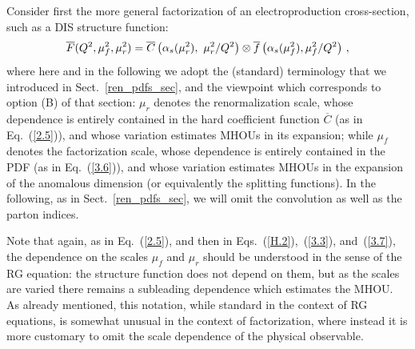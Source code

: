 Consider first
the more general factorization of an electroproduction cross-section,
such as a DIS structure function:
\begin{equation}
  \overline{F}(Q^2, \mu_f^2, \mu_r^2) = \overline{C} \left(
  \alpha_s(\mu_r^2),\ \mu_r^2/Q^2 \right) \otimes \overline{f} \left(
  \alpha_s(\mu_f^2), \mu_f^2/Q^2\right) \, ,
    \label{5.1}
\end{equation}
where here and in the following we adopt the (standard)
terminology  that
we introduced in Sect.~\ref{ren_pdfs_sec}, and the viewpoint which
corresponds to option (B) of that section: $\mu_r$ denotes the
renormalization scale, whose dependence is entirely contained in the
hard coefficient function $\overline{C}$ (as in Eq.~(\ref{2.5})),
and whose variation estimates MHOUs in its expansion; while $\mu_f$ denotes the
factorization scale, whose dependence is entirely contained in the PDF
(as in Eq.~(\ref{3.6})), and whose variation estimates MHOUs in the
expansion of the anomalous dimension (or equivalently the
splitting functions).
%
In the following, as in Sect.~\ref{ren_pdfs_sec}, we will omit the
convolution as well as the parton indices.

Note that again, as in Eq.~(\ref{2.5}), and then in
Eqs.~(\ref{H.2}),~(\ref{3.3}), and~(\ref{3.7}), the dependence on the scales
$\mu_f$ and $\mu_r$ should be understood in the sense of the RG equation: the structure
function does not depend on them, but as the scales are varied there
remains a subleading dependence which estimates the MHOU.
%
As
already mentioned, this notation, while standard in the context of RG
equations, is somewhat unusual in the context of  factorization, where
instead it is more customary to omit the scale dependence of the
physical observable.

